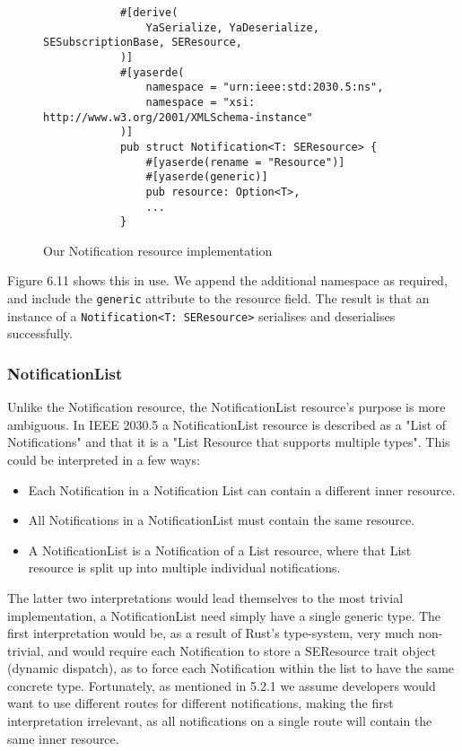 \begin{figure}[H]
    \begin{center}
        \begin{lstlisting}
            #[derive(
                YaSerialize, YaDeserialize, SESubscriptionBase, SEResource,
            )]
            #[yaserde(
                namespace = "urn:ieee:std:2030.5:ns",
                namespace = "xsi: http://www.w3.org/2001/XMLSchema-instance"
            )]
            pub struct Notification<T: SEResource> {
                #[yaserde(rename = "Resource")]
                #[yaserde(generic)]
                pub resource: Option<T>,
                ...
            }    
        \end{lstlisting}
        \label{fig:notifimpl}
        \caption{Our Notification resource implementation}
    \end{center}
\end{figure}

Figure 6.11 shows this in use. We append the additional namespace as required, and include the \texttt{generic} attribute to the resource field. The result is that an instance of a \texttt{Notification<T: SEResource>} serialises and deserialises successfully. 


\subsubsection{NotificationList}
Unlike the Notification resource, the NotificationList resource's purpose is more ambiguous. In IEEE 2030.5 a NotificationList resource is described as a "List of Notifications" and that it is a "List Resource that supports multiple types". This could be interpreted in a few ways:

\begin{itemize}
    \item Each Notification in a Notification List can contain a different inner resource.
    \item All Notifications in a NotificationList must contain the same resource.
    \item A NotificationList is a Notification of a List resource, where that List resource is split up into multiple individual notifications.
\end{itemize}

The latter two interpretations would lead themselves to the most trivial implementation, a NotificationList need simply have a single generic type. The first interpretation would be, as a result of Rust's type-system, very much non-trivial, and would require each Notification to store a SEResource trait object (dynamic dispatch), as to force each Notification within the list to have the same concrete type.
Fortunately, as mentioned in 5.2.1 we assume developers would want to use different routes for different notifications, making the first interpretation irrelevant, as all notifications on a single route will contain the same inner resource.


